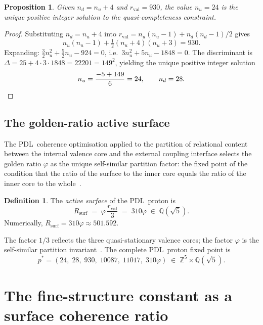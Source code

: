 \documentclass[11pt,a4paper]{article}
\newtheorem{proposition}[theorem]{Proposition}
\theoremstyle{definition}
\newtheorem{definition}[theorem]{Definition}
\newcommand{\PDL}{\textnormal{PDL}}
\newcommand{\Rsurf}{R_{\mathrm{surf}}}
\newcommand{\rval}{r_{\mathrm{val}}}
\newcommand{\vp}{\varphi}
\begin{document}
\begin{proposition}
  \label{prop:uniqueness_nu}
  Given $n_d = n_u + 4$ and $\rval = 930$, the value $n_u = 24$ is the unique positive integer solution to the quasi-completeness constraint.
\end{proposition}

\begin{proof}
  Substituting $n_d = n_u + 4$ into $\rval = n_u(n_u-1) + n_d(n_d-1)/2$ gives
  \[
    n_u(n_u - 1) + \tfrac{1}{2}(n_u+4)(n_u+3) = 930.
  \]
  Expanding: $\tfrac{3}{2}n_u^2 + \tfrac{5}{2}n_u - 924 = 0$, i.e.\ $3n_u^2 + 5n_u - 1848 = 0$. The discriminant is $\Delta = 25 + 4 \cdot 3 \cdot 1848 = 22201 = 149^2$, yielding the unique positive integer solution
  \[
    n_u = \frac{-5 + 149}{6} = 24, \qquad n_d = 28. \qedhere
  \]
\end{proof}

\subsection{The golden-ratio active surface}
\label{subsec:surface}

The \PDL\ coherence optimisation applied to the partition of relational content between the internal valence core and the external coupling interface selects the golden ratio $\vp$ as the unique self-similar partition factor: the fixed point of the condition that the ratio of the surface to the inner core equals the ratio of the inner core to the whole~\cite{Golden_Ratio_PDL_2026}.

\begin{definition}
  \label{def:active_surface}
  The \emph{active surface} of the \PDL\ proton is
  \begin{equation}
    \label{eq:Rsurf}
    \Rsurf \;=\; \vp\,\frac{\rval}{3} \;=\; 310\vp \;\in\; \mathbb{Q}(\sqrt{5}).
  \end{equation}
  Numerically, $\Rsurf = 310\vp \approx 501.592$.
\end{definition}

The factor $1/3$ reflects the three quasi-stationary valence cores; the factor $\vp$ is the self-similar partition invariant~\cite{Golden_Ratio_PDL_2026}. The complete \PDL\ proton fixed point is
\[
  p^* = (24,\; 28,\; 930,\; 10087,\; 11017,\; 310\vp)
        \;\in\; \mathbb{Z}^5 \times \mathbb{Q}(\sqrt{5}).
\]

\section{The fine-structure constant as a surface coherence ratio}
\label{sec:alpha}
\end{document}

